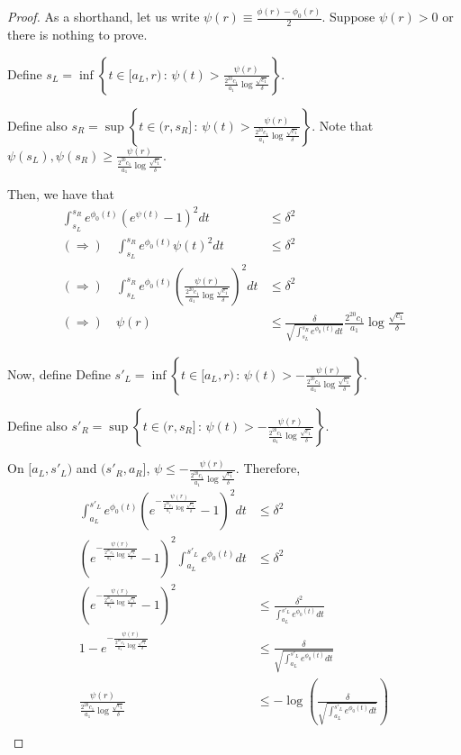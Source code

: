 \documentclass[12pt]{article}
\begin{document}
\begin{proof}

  As a shorthand, let us write $\psi(r) \equiv \frac{\phi(r) - \phi_0(r)}{2}$. Suppose $\psi(r) > 0$ or there is nothing to prove.

  Define $s_L = \inf \left \{ t \in [a_L, r) \,:\, \psi(t) > \frac{\psi(r)}{\frac{2^{20} c_1}{a_1} \log \frac{\sqrt{c_1}}{\delta}} \right \}$.

  Define also $s_R = \sup \left \{ t \in (r, s_R] \,:\, \psi(t) > \frac{\psi(r)}{\frac{2^{20} c_1}{a_1} \log \frac{\sqrt{c_1}}{\delta}} \right \}$. Note that $\psi(s_L), \psi(s_R) \geq \frac{\psi(r)}{\frac{2^{20} c_1}{a_1} \log \frac{\sqrt{c_1}}{\delta}} $.

  Then, we have that
  \begin{align}
    \int_{s_L}^{s_R} e^{\phi_0(t)} \left( e^{\psi(t)} - 1 \right)^2 dt &\leq \delta^2 \nonumber \\
    (\Rightarrow) \quad  \int_{s_L}^{s_R} e^{\phi_0(t)} \psi(t)^2 dt &\leq \delta^2 \nonumber \\
    (\Rightarrow) \quad  \int_{s_L}^{s_R} e^{\phi_0(t)}
    \left( \frac{\psi(r)}{\frac{2^{20} c_1}{a_1} \log \frac{\sqrt{c_1}}{\delta}} \right)^2 dt &\leq \delta^2 \nonumber \\
    (\Rightarrow) \quad \psi(r) &\leq
                                  \frac{ \delta}{ \sqrt{ \int_{s_L}^{s_R} e^{\phi_0(t)}dt } }
                                  \frac{2^{20} c_1}{a_1} \log \frac{\sqrt{c_1}}{\delta} \label{eqn:upper_bound1}
  \end{align}

  Now, define 
 Define $s'_L = \inf \left \{ t \in [a_L, r) \,:\, \psi(t) > -\frac{\psi(r)}{\frac{2^{20} c_1}{a_1} \log \frac{\sqrt{c_1}}{\delta}} \right \}$.

  Define also $s'_R = \sup \left \{ t \in (r, s_R] \,:\, \psi(t) > -\frac{\psi(r)}{\frac{2^{20} c_1}{a_1} \log \frac{\sqrt{c_1}}{\delta}} \right \}$.


  On $[a_L, s'_L)$ and $(s'_R, a_R]$, $\psi \leq -\frac{\psi(r)}{\frac{2^{20} c_1}{a_1} \log \frac{\sqrt{c_1}}{\delta}}$. Therefore,
  \begin{align*}
    \int_{a_L}^{s'_L} e^{\phi_0(t)}
    \left( e^{ -\frac{\psi(r)}{\frac{2^{20} c_1}{a_1} \log \frac{\sqrt{c_1}}{\delta}}} - 1 \right)^2 dt &\leq \delta^2 \\    
    \left( e^{ -\frac{\psi(r)}{\frac{2^{20} c_1}{a_1} \log \frac{\sqrt{c_1}}{\delta}}} - 1 \right)^2
    \int_{a_L}^{s'_L} e^{\phi_0(t)} dt &\leq \delta^2 \\
    \left( e^{ -\frac{\psi(r)}{\frac{2^{20} c_1}{a_1} \log \frac{\sqrt{c_1}}{\delta}}} - 1 \right)^2  &\leq
               \frac{\delta^2}{  \int_{a_L}^{s'_L} e^{\phi_0(t)} dt } \\
    1 -  e^{ -\frac{\psi(r)}{\frac{2^{20} c_1}{a_1} \log \frac{\sqrt{c_1}}{\delta}}} &\leq
          \frac{\delta}{ \sqrt{ \int_{a_L}^{s'_L} e^{\phi_0(t)} dt }} \\
    \frac{\psi(r)}{\frac{2^{20} c_1}{a_1} \log \frac{\sqrt{c_1}}{\delta}} &\leq
                 - \log \left(  \frac{\delta}{ \sqrt{ \int_{a_L}^{s'_L} e^{\phi_0(t)} dt }} \right) \\
  \end{align*}


\end{proof}
\end{document}
